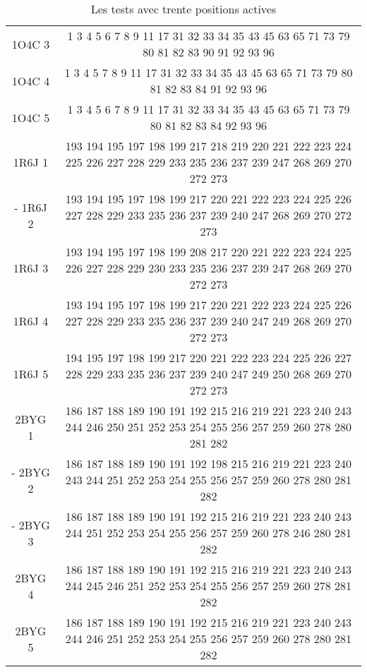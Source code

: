 \begin{table}[!htbp]
{\begin{tabular}{cc}
        1O4C 3 & 1 3 4 5 6 7 8 9 11 17 31 32 33 34 35 43 45 63 65 71 73 79 80 81 82 83 90 91 92 93 96 \\
        1O4C 4 & 1 3 4 5 7 8 9 11 17 31 32 33 34 35 43 45 63 65 71 73 79 80 81 82 83 84 91 92 93 96 \\
        1O4C 5 & 1 3 4 5 6 7 8 9 11 17 31 32 33 34 35 43 45 63 65 71 73 79 80 81 82 83 84 92 93 96 \\
        1R6J 1 & 193 194 195 197 198 199 217 218 219 220 221 222 223 224 225 226 227 228 229 233 235 236 237 239 247 268 269 270 272 273 \\
-       1R6J 2 & 193 194 195 197 198 199 217 220 221 222 223 224 225 226 227 228 229 233 235 236 237 239 240 247 268 269 270 272 273 \\
        1R6J 3 & 193 194 195 197 198 199 208 217 220 221 222 223 224 225 226 227 228 229 230 233 235 236 237 239 247 268 269 270 272 273 \\
        1R6J 4 & 193 194 195 197 198 199 217 220 221 222 223 224 225 226 227 228 229 233 235 236 237 239 240 247 249 268 269 270 272 273 \\
        1R6J 5 & 194 195 197 198 199 217 220 221 222 223 224 225 226 227 228 229 233 235 236 237 239 240 247 249 250 268 269 270 272 273 \\
        2BYG 1 & 186 187 188 189 190 191 192 215 216 219 221 223 240 243 244 246 250 251 252 253 254 255 256 257 259 260 278 280 281 282 \\
-       2BYG 2 & 186 187 188 189 190 191 192 198 215 216 219 221 223 240 243 244 251 252 253 254 255 256 257 259 260 278 280 281 282 \\
-       2BYG 3 & 186 187 188 189 190 191 192 215 216 219 221 223 240 243 244 251 252 253 254 255 256 257 259 260 278 246 280 281 282 \\
        2BYG 4 & 186 187 188 189 190 191 192 215 216 219 221 223 240 243 244 245 246 251 252 253 254 255 256 257 259 260 278 281 282 \\
        2BYG 5 & 186 187 188 189 190 191 192 215 216 219 221 223 240 243 244 246 251 252 253 254 255 256 257 259 260 278 280 281 282 \\

        \bottomrule

      \end{tabular}   
}   
      \caption{Les tests avec trente positions actives}
\label{tab:test30}      
    \end{table}





